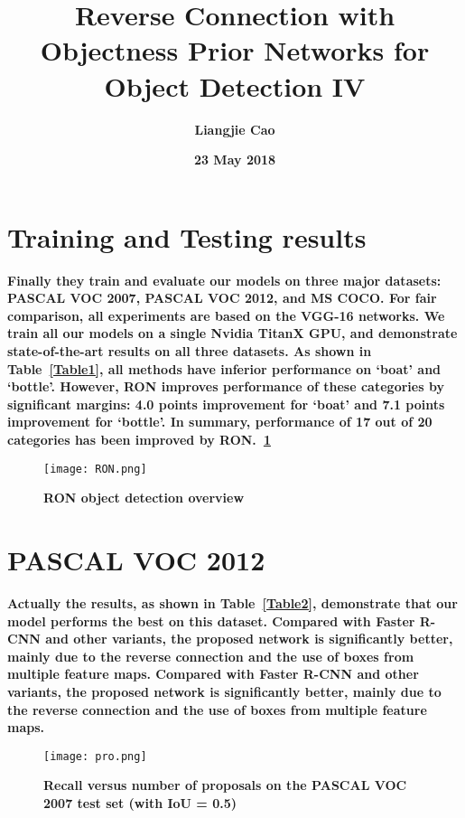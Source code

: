\documentclass[40pt]{article}
\begin{document}
\title{\textbf{Reverse Connection with Objectness Prior Networks for Object Detection IV}}
\author{\textbf{Liangjie Cao}}
\date{\textbf{23 May 2018}}
\maketitle
\par
\setlength{\baselineskip}{15pt}
\section{Training and Testing results}
\textbf{Finally they train and evaluate our models on three major datasets: PASCAL VOC 2007, PASCAL VOC 2012, and MS COCO. For fair comparison, all experiments are based on the VGG-16 networks. We train all our models on a single Nvidia TitanX GPU, and demonstrate state-of-the-art results on all three datasets.  As shown in Table~\ref{Table1}, all methods have inferior performance on ‘boat’ and ‘bottle’. However, RON improves performance of these categories by signiﬁcant margins: 4.0 points improvement for ‘boat’ and 7.1 points improvement for ‘bottle’. In summary, performance of 17 out of 20 categories has been improved by RON.~\ref{Figure1}}
\begin{figure}[htbp]
 \centering
 \texttt{[image: RON.png]}\\
 \caption{\textbf{RON object detection overview}}\label{Figure1}
 \end{figure}
\par
\section{PASCAL VOC 2012}
\textbf{Actually the results, as shown in Table~\ref{Table2}, demonstrate that our model performs the best on this dataset. Compared with Faster R-CNN and other variants\cite{name6}\cite{name7}, the proposed network is signiﬁcantly better, mainly due to the reverse connection and the use of boxes from multiple feature maps. Compared with Faster R-CNN and other variants, the proposed network is signiﬁcantly better, mainly due to the reverse connection and the use of boxes from multiple feature maps.
}
\begin{figure}[htbp]
  \centering
 \texttt{[image: pro.png]}\\
 \caption{\textbf{Recall versus number of proposals on the PASCAL VOC 2007 test set (with IoU = 0.5)}}\label{Figure2}
\end{figure}
\par
\end{document}
